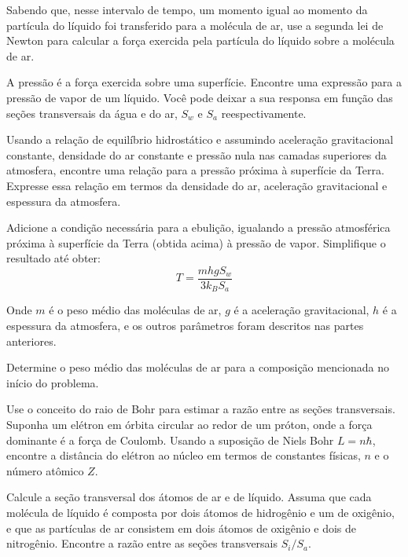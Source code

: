 \documentclass[11pt]{article}
\begin{document}
\begin{pproblem}
\begin{alternativas}
Sabendo que, nesse intervalo de tempo, um momento igual ao momento da partícula do líquido foi transferido para a molécula de ar, use a segunda lei de Newton para calcular a força exercida pela partícula do líquido sobre a molécula de ar. 

\item A pressão é a força exercida sobre uma superfície. Encontre uma expressão para a pressão de vapor de um líquido. Você pode deixar a sua responsa em função das seções transversais da água e do ar, \(S_w\) e \(S_a\) reespectivamente.

\item Usando a relação de equilíbrio hidrostático e assumindo aceleração gravitacional constante, densidade do ar constante e pressão nula nas camadas superiores da atmosfera, encontre uma relação para a pressão próxima à superfície da Terra. Expresse essa relação em termos da densidade do ar, aceleração gravitacional e espessura da atmosfera. 

\item Adicione a condição necessária para a ebulição, igualando a pressão atmosférica próxima à superfície da Terra (obtida acima) à pressão de vapor. Simplifique o resultado até obter:
\begin{equation}
    T = \frac{mhg S_w}{3k_B S_a}
\end{equation}

Onde $m$ é o peso médio das moléculas de ar, $g$ é a aceleração gravitacional, $h$ é a espessura da atmosfera, e os outros parâmetros foram descritos nas partes anteriores. 

\item Determine o peso médio das moléculas de ar para a composição mencionada no início do problema. 

\item Use o conceito do raio de Bohr para estimar a razão entre as seções transversais. Suponha um elétron em órbita circular ao redor de um próton, onde a força dominante é a força de Coulomb. Usando a suposição de Niels Bohr $L = n\hbar$, encontre a distância do elétron ao núcleo em termos de constantes físicas, $n$ e o número atômico $Z$. 

\item Calcule a seção transversal dos átomos de ar e de líquido. Assuma que cada molécula de líquido é composta por dois átomos de hidrogênio e um de oxigênio, e que as partículas de ar consistem em dois átomos de oxigênio e dois de nitrogênio. Encontre a razão entre as seções transversais $S_i/S_a$. 


\end{alternativas}
\end{pproblem}
\end{document}
